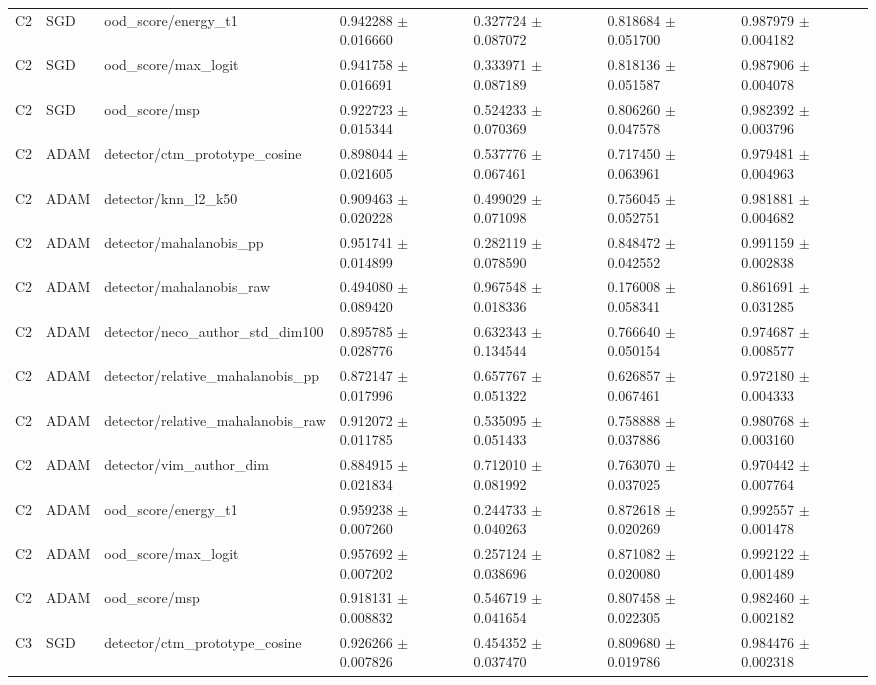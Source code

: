 \begin{longtable}{lllllll}
C2 & SGD & ood\_score/energy\_t1 & 0.942288 $\pm$ 0.016660 & 0.327724 $\pm$ 0.087072 & 0.818684 $\pm$ 0.051700 & 0.987979 $\pm$ 0.004182 \\
C2 & SGD & ood\_score/max\_logit & 0.941758 $\pm$ 0.016691 & 0.333971 $\pm$ 0.087189 & 0.818136 $\pm$ 0.051587 & 0.987906 $\pm$ 0.004078 \\
C2 & SGD & ood\_score/msp & 0.922723 $\pm$ 0.015344 & 0.524233 $\pm$ 0.070369 & 0.806260 $\pm$ 0.047578 & 0.982392 $\pm$ 0.003796 \\
C2 & ADAM & detector/ctm\_prototype\_cosine & 0.898044 $\pm$ 0.021605 & 0.537776 $\pm$ 0.067461 & 0.717450 $\pm$ 0.063961 & 0.979481 $\pm$ 0.004963 \\
C2 & ADAM & detector/knn\_l2\_k50 & 0.909463 $\pm$ 0.020228 & 0.499029 $\pm$ 0.071098 & 0.756045 $\pm$ 0.052751 & 0.981881 $\pm$ 0.004682 \\
C2 & ADAM & detector/mahalanobis\_pp & 0.951741 $\pm$ 0.014899 & 0.282119 $\pm$ 0.078590 & 0.848472 $\pm$ 0.042552 & 0.991159 $\pm$ 0.002838 \\
C2 & ADAM & detector/mahalanobis\_raw & 0.494080 $\pm$ 0.089420 & 0.967548 $\pm$ 0.018336 & 0.176008 $\pm$ 0.058341 & 0.861691 $\pm$ 0.031285 \\
C2 & ADAM & detector/neco\_author\_std\_dim100 & 0.895785 $\pm$ 0.028776 & 0.632343 $\pm$ 0.134544 & 0.766640 $\pm$ 0.050154 & 0.974687 $\pm$ 0.008577 \\
C2 & ADAM & detector/relative\_mahalanobis\_pp & 0.872147 $\pm$ 0.017996 & 0.657767 $\pm$ 0.051322 & 0.626857 $\pm$ 0.067461 & 0.972180 $\pm$ 0.004333 \\
C2 & ADAM & detector/relative\_mahalanobis\_raw & 0.912072 $\pm$ 0.011785 & 0.535095 $\pm$ 0.051433 & 0.758888 $\pm$ 0.037886 & 0.980768 $\pm$ 0.003160 \\
C2 & ADAM & detector/vim\_author\_dim & 0.884915 $\pm$ 0.021834 & 0.712010 $\pm$ 0.081992 & 0.763070 $\pm$ 0.037025 & 0.970442 $\pm$ 0.007764 \\
C2 & ADAM & ood\_score/energy\_t1 & 0.959238 $\pm$ 0.007260 & 0.244733 $\pm$ 0.040263 & 0.872618 $\pm$ 0.020269 & 0.992557 $\pm$ 0.001478 \\
C2 & ADAM & ood\_score/max\_logit & 0.957692 $\pm$ 0.007202 & 0.257124 $\pm$ 0.038696 & 0.871082 $\pm$ 0.020080 & 0.992122 $\pm$ 0.001489 \\
C2 & ADAM & ood\_score/msp & 0.918131 $\pm$ 0.008832 & 0.546719 $\pm$ 0.041654 & 0.807458 $\pm$ 0.022305 & 0.982460 $\pm$ 0.002182 \\
C3 & SGD & detector/ctm\_prototype\_cosine & 0.926266 $\pm$ 0.007826 & 0.454352 $\pm$ 0.037470 & 0.809680 $\pm$ 0.019786 & 0.984476 $\pm$ 0.002318 \\

\end{longtable}
